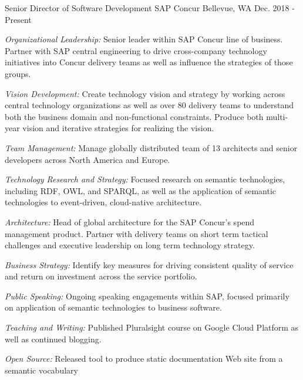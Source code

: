 


\begin{cventries}


\cventry
{Senior Director of Software Development} %
{SAP Concur} %
{Bellevue, WA} %
{Dec. 2018 - Present} %
{ %
\begin{cvitems}
\item {\emph{Organizational Leadership:} Senior leader within SAP Concur line of business. Partner with SAP central engineering to drive cross-company technology initiatives into Concur delivery teams as well as influence the strategies of those groups. }
\item {\emph{Vision Development:} Create technology vision and strategy by working across central technology organizations as well as over 80 delivery teams to understand both the business domain and non-functional constraints. Produce both multi-year vision and iterative strategies for realizing the vision.}
\item {\emph{Team Management:} Manage globally distributed team of 13 architects and senior developers across North America and Europe.}
\item {\emph{Technology Research and Strategy:} Focused research on semantic technologies, including RDF, OWL, and SPARQL, as well as the application of semantic technologies to event-driven, cloud-native architecture.}
\item {\emph{Architecture:} Head of global architecture for the SAP Concur’s spend management product. Partner with delivery teams on short term tactical challenges and executive leadership on long term technology strategy.}
\item {\emph{Business Strategy:} Identify key measures for driving consistent quality of service and return on investment across the service portfolio.}
\item {\emph{Public Speaking:} Ongoing speaking engagements within SAP, focused primarily on application of semantic technologies to business software.}
\item {\emph{Teaching and Writing:} Published Pluralsight course on Google Cloud Platform as well as continued blogging.}
\item {\emph{Open Source:} Released tool to produce static documentation Web site from a semantic vocabulary}
\end{cvitems}
}


\end{cventries}
